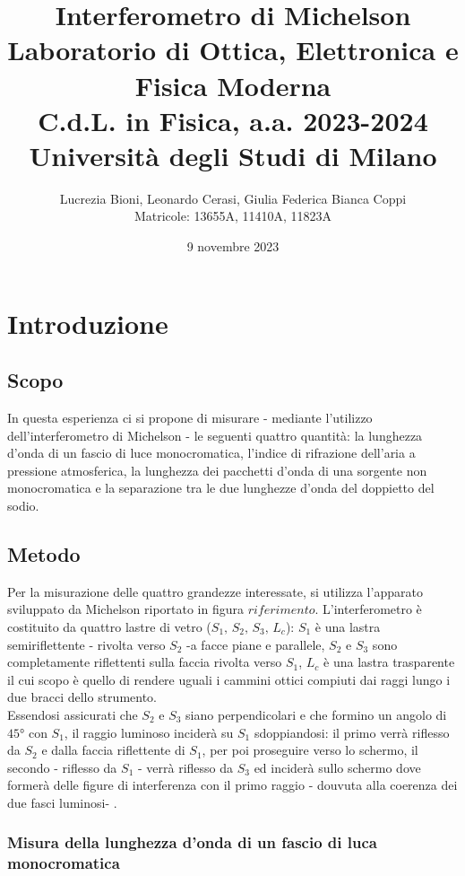 \documentclass[]{article}
\title{%
    \Huge Interferometro di Michelson \\
    \Large Laboratorio di Ottica, Elettronica e Fisica Moderna \\ C.d.L. in Fisica, a.a. 2023-2024 \\ Università degli Studi di Milano}
\author{\LARGE Lucrezia Bioni, Leonardo Cerasi, Giulia Federica Bianca Coppi \\ Matricole: 13655A, 11410A, 11823A}
\date{9 novembre 2023}
\let\oldsection\section%
\renewcommand{\section}{%
	\renewcommand{\theequation}{\thesection.\arabic{equation}}%
	\oldsection}%
\let\oldsubsection\subsection%
\renewcommand{\subsection}{%
	\renewcommand{\theequation}{\thesubsection.\arabic{equation}}%
	\oldsubsection}%
\begin{document}
\maketitle

\section{Introduzione}

\subsection{Scopo}

In questa esperienza ci si propone di misurare - mediante l'utilizzo dell'interferometro di Michelson - le seguenti quattro quantità: la lunghezza d'onda di un fascio di luce monocromatica, l'indice di rifrazione dell'aria a pressione atmosferica, la lunghezza dei pacchetti d'onda di una sorgente non monocromatica e la separazione tra le due lunghezze d'onda del doppietto del sodio.

\subsection{Metodo}

Per la misurazione delle quattro grandezze interessate, si utilizza l'apparato sviluppato da Michelson riportato in figura $riferimento$. L'interferometro è costituito da quattro lastre di vetro ($S_1, \, S_2, \, S_3, \, L_c$): $S_1$ è una lastra semiriflettente - rivolta verso $S_2$ -a facce piane e parallele, $S_2$ e $S_3$ sono completamente riflettenti sulla faccia rivolta verso $S_1$, $L_c$ è una lastra trasparente il cui scopo è quello di rendere uguali i cammini ottici compiuti dai raggi lungo i due bracci dello strumento. \\ Essendosi assicurati che $S_2$ e $S_3$ siano perpendicolari e che formino un angolo di $45°$ con $S_1$, il raggio luminoso inciderà su $S_1$ sdoppiandosi: il primo verrà riflesso da $S_2$ e dalla faccia riflettente di $S_1$, per poi proseguire verso lo schermo, il secondo - riflesso da $S_1$ - verrà riflesso da $S_3$ ed inciderà sullo schermo dove formerà delle figure di interferenza con il primo raggio - douvuta alla coerenza dei due fasci luminosi- .

\subsubsection{Misura della lunghezza d'onda di un fascio di luca monocromatica}
\end{document}
